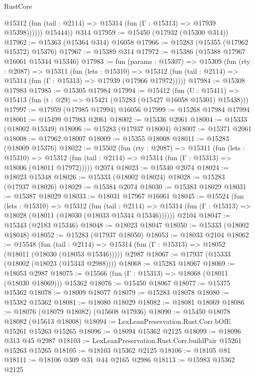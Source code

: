 \begin{lexlean}{RustCore}
\begin{coremodule}
              @15312 (fun (tail : @2114) => @15314 (fun (Γ : @15313) => @17939 @15398))))))
        @15444))
    @314
@17959 := @15450 (@17932 (@15300 @314))
@17962 := @15363 (@15364 @314) @16058
@17966 := @15283 (@15355 (@17962 @15372) @15376)
@17967 := @15389 @314
@17972 := @15386 (@15388 @17967 @16061 @15344 @15346)
@17983 := fun (params : @15307) =>
  @15309
    (fun (rty : @2087) =>
    @15311
      (fun (lets : @15310) =>
      @15312 (fun (tail : @2114) => @15314 (fun (Γ : @15313) => @17939 (@17966 @17972)))))
@17984 := @15308 @17983
@17985 := @15305 @17984
@17994 := @15412
    (fun (U : @15411) => @15413 (fun (t : @29) => @15421 (@15283 (@15427 @16058 @15301) @15438)))
@17997 := @17959 (@17985 @17994) @16056
@17999 := @15268 @17984 @17994
@18001 := @15499 @17983 @2061
@18002 := @15336 @2061
@18004 := @15333 (@18002 @15349)
@18006 := @15283 (@17937 @18004)
@18007 := @15371 @2061
@18008 := @17962 @18007
@18009 := @15355 @18008
@18011 := @15283 (@18009 @15376)
@18022 := @15502
    (fun (rty : @2087) =>
    @15311
      (fun (lets : @15310) =>
      @15312 (fun (tail : @2114) => @15314 (fun (Γ : @15313) => @18006 (@18011 @17972)))))
    @2074
@18023 := @15340 @2074
@18024 := @18023 @15348
@18026 := @15333 (@18002 @18024)
@18028 := @15283 (@17937 @18026)
@18029 := @15384 @2074
@18030 := @15383 @18029
@18031 := @15387 @18029
@18033 := @18031 @17967 @16061
@18045 := @15524
    (fun (lets : @15310) =>
    @15312
      (fun (tail : @2114) =>
      @15314 (fun (Γ : @15313) => @18028 (@18011 (@18030 (@18033 @15344 @15346))))))
    @2104
@18047 := @15343 (@2183 @15346)
@18048 := @18023 @18047
@18050 := @15333 (@18002 @18048)
@18052 := @15283 (@17937 @18050)
@18053 := @18033 @2104
@18062 := @15548
    (fun (tail : @2114) => @15314 (fun (Γ : @15313) => @18052 (@18011 (@18030 (@18053 @15346)))))
    @2987
@18067 := @17937 (@15333 (@18002 (@18023 (@15343 @2988))))
@18068 := @15283 @18067
@18069 := @18053 @2987
@18075 := @15566 (fun (Γ : @15313) => @18068 (@18011 (@18030 @18069))) @15362
@18076 := @15450 @18067
@18077 := @15375 @15362
@18078 := @18009 @18077
@18079 := @15283 @18078
@18080 := @15382 @15362
@18081 := @18080 @18029
@18082 := @18081 @18069
@18086 := @18076 (@18079 @18082) (@15608 @17936)
@18090 := @15450 @18078 @18082 (@15613 @18008)
@18094 := LexLeanPreservation.Rust.Corr.bOfE @15261 @15263 @15265
@18096 := @18094 @15362 @2125
@18099 := @18096 @313 @45 @2987
@18103 := LexLeanPreservation.Rust.Corr.buildPair @15261 @15263 @15265
@18105 := @18103 @15362 @2125
@18106 := @18105 @81
@18111 := @18106 @309 @31 @44 @2165 @2986
@18113 := @15983 @15362 @2125

\end{coremodule}
\end{lexlean}
